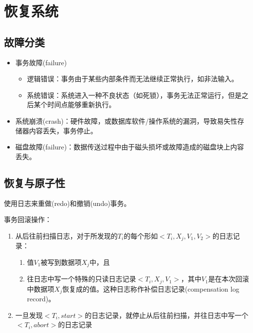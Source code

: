 
\section{恢复系统} %
\subsection{故障分类}
\begin{itemize}
	\item 事务故障(failure)
	\begin{itemize}
		\item 逻辑错误：事务由于某些内部条件而无法继续正常执行，如非法输入。
		\item 系统错误：系统进入一种不良状态（如死锁），事务无法正常运行，但是之后某个时间点能够重新执行。
	\end{itemize}
	\item 系统崩溃(crash)：硬件故障，或数据库软件/操作系统的漏洞，导致易失性存储器内容丢失，事务停止。
	\item 磁盘故障(failure)：数据传送过程中由于磁头损坏或故障造成的磁盘块上内容丢失。
\end{itemize}

\subsection{恢复与原子性}
使用日志来重做(redo)和撤销(undo)事务。

事务回滚操作：
\begin{enumerate}
	\item 从后往前扫描日志，对于所发现的$T_i$的每个形如$<T_i,X_j,V_1,V_2>$的日志记录：
	\begin{enumerate}
		\item 值$V_1$被写到数据项$X_j$中，且
		\item 往日志中写一个特殊的只读日志记录$<T_i,X_j,V_1>$，其中$V_1$是在本次回滚中数据项$X_j$恢复成的值。这种日志称作补偿日志记录(compensation log record)。
	\end{enumerate}
	\item 一旦发现$<T_i,start>$的日志记录，就停止从后往前扫描，并往日志中写一个$<T_i,abort>$的日志记录
\end{enumerate}